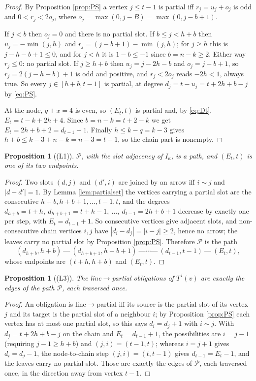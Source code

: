 \documentclass[reqno]{amsart}
\theoremstyle{plain}
\newtheorem{proposition}[theorem]{Proposition}
\theoremstyle{definition}
\newcommand{\ka}{\kappa}
\begin{document}
\begin{proof}
By Proposition \ref{prop:PS} a vertex $j\le t-1$ is partial iff
$r_j=u_j+o_j$ is odd and $0<r_j<2o_j$, where $o_j=\max(0,j-B)=\max(0,j-b+1)$.

If $j<b$ then $o_j=0$ and there is no partial slot.  If $b\le j<h+b$ then
$u_j=-\min(j,h)$ and $r_j=(j-b+1)-\min(j,h)$; for $j\ge h$ this is
$j-h-b+1\le0$, and for $j<h$ it is $1-b\le-1$ since $b=n-k\ge2$.  Either way
$r_j\le0$: no partial slot.  If $j\ge h+b$ then $u_j=j-2h-b$ and $o_j=j-b+1$,
so $r_j=2(j-h-b)+1$ is odd and positive, and $r_j<2o_j$ reads $-2h<1$, always
true.  So every $j\in[h+b,t-1]$ is partial, at degree
$d_j=t-u_j=t+2h+b-j$ by \eqref{eq:PS}.

At the node, $q+x=4$ is even, so $(E_t,t)$ is partial and, by \eqref{eq:Dt},
$E_t=t-k+2h+4$.  Since $b=n-k=t+2-k$ we get $E_t=2h+b+2=d_{t-1}+1$.  Finally
$h\le k-q=k-3$ gives $h+b\le k-3+n-k=n-3=t-1$, so the chain part is nonempty.
\end{proof}

\begin{proposition}[\textup{(L1)}]\label{prop:L1}
$\mathcal{P}$, with the slot adjacency of $I_\ka$, is a path, and $(E_t,t)$ is
one of its two endpoints.
\end{proposition}

\begin{proof}
Two slots $(d,j)$ and $(d',i)$ are joined by an arrow iff $i\sim j$ and
$|d-d'|=1$.  By Lemma \ref{lem:partialset} the vertices carrying a partial slot
are the consecutive $h+b,h+b+1,\dots,t-1,t$, and the degrees
$d_{h+b}=t+h,\ d_{h+b+1}=t+h-1,\ \dots,\ d_{t-1}=2h+b+1$ decrease by exactly
one per step, with $E_t=d_{t-1}+1$.  So consecutive vertices give adjacent
slots, and non-consecutive chain vertices $i,j$ have
$|d_i-d_j|=|i-j|\ge2$, hence no arrow; the leaves carry no partial slot by
Proposition \ref{prop:PS}.  Therefore $\mathcal{P}$ is the path
\[
   (d_{h+b},h+b)\ \text{---}\ (d_{h+b+1},h+b+1)\ \text{---}\cdots\text{---}\
   (d_{t-1},t-1)\ \text{---}\ (E_t,t),
\]
whose endpoints are $(t+h,h+b)$ and $(E_t,t)$.
\end{proof}

\begin{proposition}[\textup{(L3)}]\label{prop:L3}
The line$\to$partial obligations of $T^{\,l}(v)$ are exactly the edges of the
path $\mathcal{P}$, each traversed once.
\end{proposition}

\begin{proof}
An obligation is line$\to$partial iff its source is the partial slot of its
vertex $j$ and its target is the partial slot of a neighbour $i$; by
Proposition \ref{prop:PS} each vertex has at most one partial slot, so this
says $d_i=d_j+1$ with $i\sim j$.  With $d_j=t+2h+b-j$ on the chain and
$E_t=d_{t-1}+1$, the possibilities are $i=j-1$ (requiring $j-1\ge h+b$) and
$(j,i)=(t-1,t)$; whereas $i=j+1$ gives $d_i=d_j-1$, the node-to-chain step
$(j,i)=(t,t-1)$ gives $d_{t-1}=E_t-1$, and the leaves carry no partial slot.
Those are exactly the edges of $\mathcal{P}$, each traversed once, in the
direction away from vertex $t-1$.
\end{proof}
\end{document}
